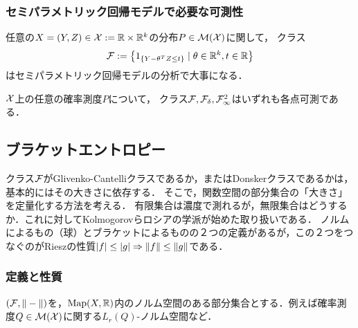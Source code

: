 \documentclass[uplatex,dvipdfmx]{jsreport}
\begin{document}
\subsubsection{セミパラメトリック回帰モデルで必要な可測性}

\begin{definition}
    任意の$X=(Y,Z)\in\mathcal{X}:=\mathbb{R}\times\mathbb{R}^k$の分布$P\in\mathcal{M}(\mathcal{X})$に関して，
    クラス
    \[\mathcal{F}:=\left\{1_{\left\{Y-\theta^TZ\le t\right\}}\mid\theta\in\mathbb{R}^k,t\in\mathbb{R}\right\}\]
    はセミパラメトリック回帰モデルの分析で大事になる．
\end{definition}

\begin{proposition}
    $\mathcal{X}$上の任意の確率測度$P$について，
    クラス$\mathcal{F},\mathcal{F}_\delta,\mathcal{F}^2_\infty$はいずれも各点可測である．
\end{proposition}

\subsection{ブラケットエントロピー}

\begin{tcolorbox}[colframe=ForestGreen, colback=ForestGreen!10!white,breakable,colbacktitle=ForestGreen!40!white,coltitle=black,fonttitle=\bfseries\sffamily,
title=道具３：]
    クラス$\mathcal{F}$がGlivenko-Cantelliクラスであるか，またはDonskerクラスであるかは，基本的にはその大きさに依存する．
    そこで，関数空間の部分集合の「大きさ」を定量化する方法を考える．
    有限集合は濃度で測れるが，無限集合はどうするか．これに対してKolmogorovらロシアの学派が始めた取り扱いである．
    ノルムによるもの（球）とブラケットによるものの２つの定義があるが，この２つをつなぐのがRieszの性質$\lvert f\rvert\le\lvert g\rvert\Rightarrow\|f\|\le\|g\|$である．
\end{tcolorbox}

\subsubsection{定義と性質}

\begin{notation}
    $(\mathcal{F},\|-\|)$を，$\mathrm{Map}(X,\mathbb{R})$内のノルム空間のある部分集合とする．例えば確率測度$Q\in\mathcal{M}(\mathcal{X})$に関する$L_r(Q)$-ノルム空間など．
\end{notation}
\end{document}
